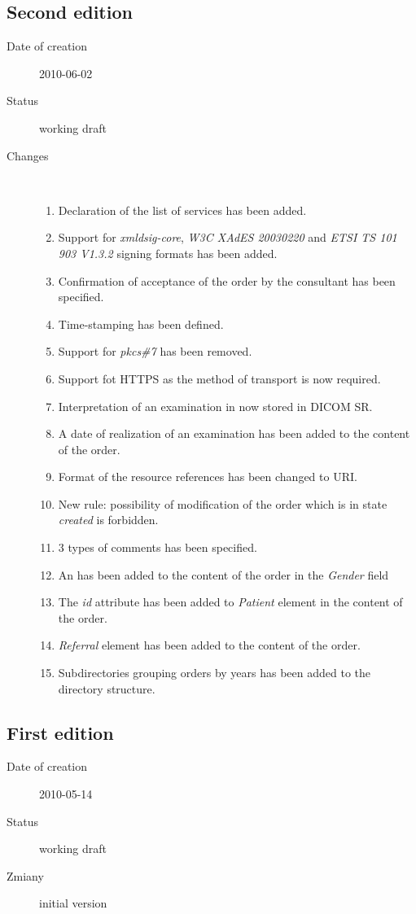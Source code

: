 \documentclass[a4paper]{article}
\begin{document}
\subsection{Second edition}
\begin{description}
  \item[Date of creation] 2010-06-02
  \item[Status] working draft
  \item[Changes] \hfill \\
	\begin{enumerate}
      \item Declaration of the list of services has been added.
	  \item Support for \emph{xmldsig-core}, \emph{W3C XAdES 20030220} 
		and \emph{ETSI TS 101 903 V1.3.2} signing formats has been added.
	  \item Confirmation of acceptance of the order by the consultant has been specified.
	  \item Time-stamping has been defined.
      \item Support for \emph{pkcs\#7} has been removed.
      \item Support fot HTTPS as the method of transport is now required.
      \item Interpretation of an examination in now stored in DICOM SR.
      \item A date of realization of an examination has been added to the content of the order.
      \item Format of the resource references has been changed to URI.
      \item New rule: possibility of modification of the order which is in state \emph{created}
		is forbidden.
      \item 3 types of comments has been specified.
      \item An  has been added to the content of the 
			order in the \emph{Gender} field
      \item The \emph{id} attribute has been added to \emph{Patient} element in the content
			of the order. 
      \item \emph{Referral} element has been added to the content of the order.
      \item Subdirectories grouping orders by years has been added to the directory 
		structure.
	\end{enumerate}
\end{description}

\subsection{First edition}
\begin{description}
  \item[Date of creation] 2010-05-14
  \item[Status] working draft
  \item[Zmiany] initial version
\end{description}
\end{document}
